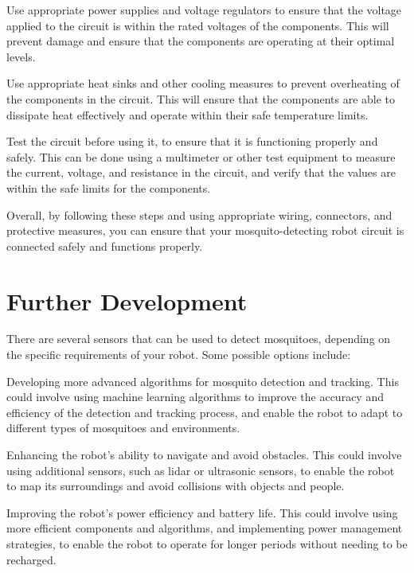\documentclass[11pt]{article}
\begin{document}
	Use appropriate power supplies and voltage regulators to ensure that the voltage applied to the circuit is within the rated voltages of the components. This will prevent damage and ensure that the components are operating at their optimal levels.
	
	Use appropriate heat sinks and other cooling measures to prevent overheating of the components in the circuit. This will ensure that the components are able to dissipate heat effectively and operate within their safe temperature limits.
	
	Test the circuit before using it, to ensure that it is functioning properly and safely. This can be done using a multimeter or other test equipment to measure the current, voltage, and resistance in the circuit, and verify that the values are within the safe limits for the components.
	
	Overall, by following these steps and using appropriate wiring, connectors, and protective measures, you can ensure that your mosquito-detecting robot circuit is connected safely and functions properly.
	
	
	
	
	
	
	
	
	
	\section{Further Development}
	
	
	There are several sensors that can be used to detect mosquitoes, depending on the specific requirements of your robot. Some possible options include:
	
	Developing more advanced algorithms for mosquito detection and tracking. This could involve using machine learning algorithms to improve the accuracy and efficiency of the detection and tracking process, and enable the robot to adapt to different types of mosquitoes and environments.
	
	Enhancing the robot's ability to navigate and avoid obstacles. This could involve using additional sensors, such as lidar or ultrasonic sensors, to enable the robot to map its surroundings and avoid collisions with objects and people.
	
	Improving the robot's power efficiency and battery life. This could involve using more efficient components and algorithms, and implementing power management strategies, to enable the robot to operate for longer periods without needing to be recharged.
	
\end{document}
